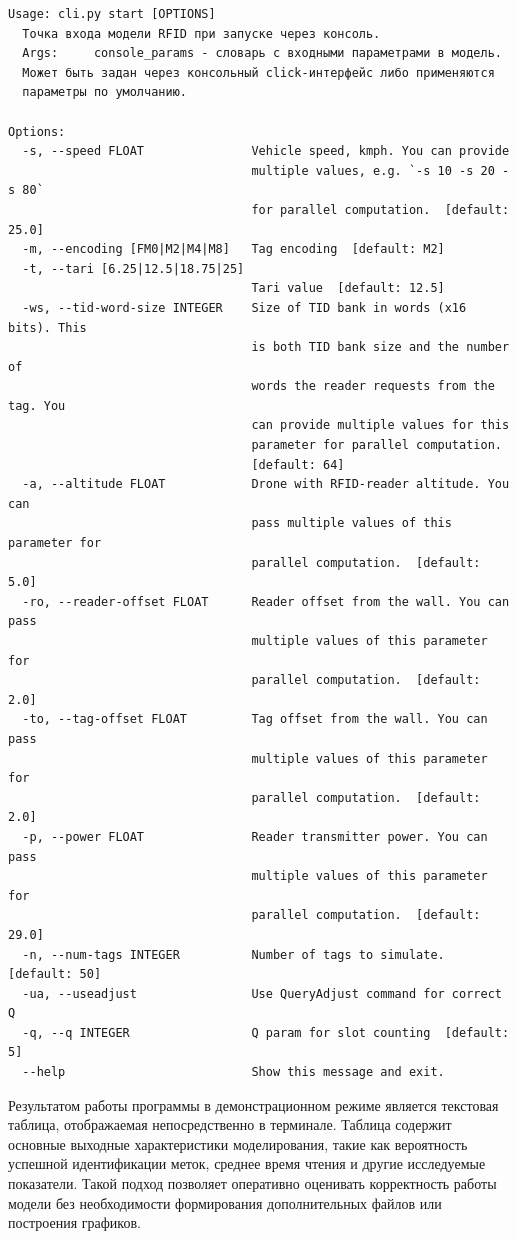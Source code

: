 \documentclass[12pt]{article}
\theoremstyle{definition}
\begin{document}
\begin{verbatim}
Usage: cli.py start [OPTIONS]
  Точка входа модели RFID при запуске через консоль.
  Args:     console_params - словарь с входными параметрами в модель.
  Может быть задан через консольный click-интерфейс либо применяются
  параметры по умолчанию.

Options:
  -s, --speed FLOAT               Vehicle speed, kmph. You can provide
                                  multiple values, e.g. `-s 10 -s 20 -s 80`
                                  for parallel computation.  [default: 25.0]
  -m, --encoding [FM0|M2|M4|M8]   Tag encoding  [default: M2]
  -t, --tari [6.25|12.5|18.75|25]
                                  Tari value  [default: 12.5]
  -ws, --tid-word-size INTEGER    Size of TID bank in words (x16 bits). This
                                  is both TID bank size and the number of
                                  words the reader requests from the tag. You
                                  can provide multiple values for this
                                  parameter for parallel computation.
                                  [default: 64]
  -a, --altitude FLOAT            Drone with RFID-reader altitude. You can
                                  pass multiple values of this parameter for
                                  parallel computation.  [default: 5.0]
  -ro, --reader-offset FLOAT      Reader offset from the wall. You can pass
                                  multiple values of this parameter for
                                  parallel computation.  [default: 2.0]
  -to, --tag-offset FLOAT         Tag offset from the wall. You can pass
                                  multiple values of this parameter for
                                  parallel computation.  [default: 2.0]
  -p, --power FLOAT               Reader transmitter power. You can pass
                                  multiple values of this parameter for
                                  parallel computation.  [default: 29.0]
  -n, --num-tags INTEGER          Number of tags to simulate.  [default: 50]
  -ua, --useadjust                Use QueryAdjust command for correct Q
  -q, --q INTEGER                 Q param for slot counting  [default: 5]
  --help                          Show this message and exit.
\end{verbatim}

Результатом работы программы в демонстрационном режиме является текстовая таблица, отображаемая непосредственно в терминале. Таблица содержит основные выходные характеристики моделирования, такие как вероятность успешной идентификации меток, среднее время чтения и другие исследуемые показатели. Такой подход позволяет оперативно оценивать корректность работы модели без необходимости формирования дополнительных файлов или построения графиков. 
\end{document}
